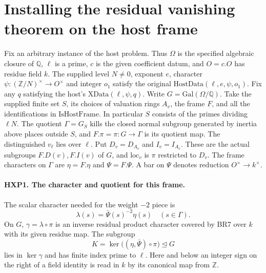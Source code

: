\section{Installing the residual vanishing theorem on the host frame}
\label{sec:hxp60}

Fix an arbitrary instance of the host problem. Thus $\Omega$ is the
specified algebraic closure of $\mathbb Q$, $\ell$ is a prime, $c$ is
the given coefficient datum, and $O=c.O$ has residue field $k$.
The supplied level $N\ne0$, exponent $e$, character
$\psi:(\mathbb Z/N)^\times\to O^\times$ and integer $o_1$ satisfy
the original $\mathrm{HostData}(\ell,e,\psi,o_1)$. Fix any $q$ satisfying
the host's $\mathrm{XData}(\ell,\psi,q)$. Write $G=\mathrm{Gal}(\Omega/\mathbb Q)$.
Take the supplied finite set $S$, its choices of valuation rings
$A_v$, the frame $F$, and all the identifications in
$\mathrm{IsHostFrame}$. In particular $S$ consists of the primes dividing
$\ell N$. The quotient $\Gamma=G_S$ kills the closed normal subgroup
generated by inertia above places outside $S$, and $F.\pi=\pi:G\to\Gamma$
is its quotient map. The distinguished $v_\ell$ lies over $\ell$.
Put $D_v=D_{A_v}$ and $I_v=I_{A_v}$. These are the actual subgroups
$F.D(v),F.I(v)$ of $G$, and $\mathrm{loc}_v$ is $\pi$ restricted to $D_v$.
The frame characters on $\Gamma$ are $\eta=F.\eta$ and $\Psi=F.\Psi$.
A bar on $\Psi$ denotes reduction $O^\times\to k^\times$.

\paragraph{HXP1. The character and quotient for this frame.}
\label{claim:HXP1}
The scalar character needed for the weight $-2$ piece is
\[
   \lambda(s)=\bar\Psi(s)^{-2}\eta(s)\quad (s\in\Gamma).
\]
On $G$, $\gamma=\lambda\circ\pi$ is an inverse residual product
character covered by BR7 over $k$ with its given residue map.
The subgroup
\[
    K=\ker\big((\eta,\bar\Psi)\circ\pi\big)\trianglelefteq G
\]
lies in $\ker\gamma$ and has finite index prime to $\ell$.
Here and below an integer sign on the right of a field identity is
read in $k$ by its canonical map from $\mathbb Z$.

